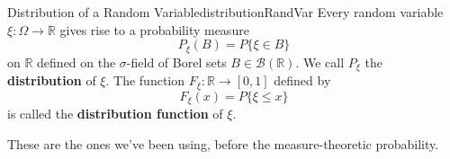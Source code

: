         \begin{defn}{Distribution of a Random Variable}{distributionRandVar}
            Every random variable $\xi:\Omega \to \mathbb{R}$ gives rise to a probability measure
            \begin{equation}
                P_\xi(B) = P\{\xi \in B\}
            \end{equation}
            on $\mathbb{R}$ defined on the $\sigma$-field of Borel sets $B \in \mathcal{B}(\mathbb{R})$.
            We call $P_\xi$ the \textbf{distribution} of $\xi$. The function $F_\xi: \mathbb{R}\to[0,1]$
            defined by
            \begin{equation}
                F_\xi(x) = P\{\xi \leq x\}
            \end{equation}
            is called the \textbf{distribution function} of $\xi$.
        \end{defn}
        These are the ones we've been using, before the measure-theoretic probability.

        